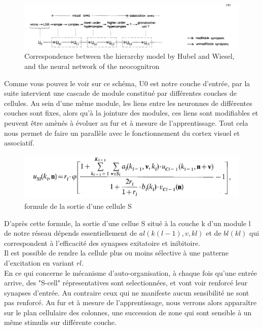 \documentclass[12pt, letterpaper]{article}
\begin{document}
\begin{figure}[H]
    \includegraphics[width=\linewidth]{img/fig1.png}
    \caption{Correspondence between the hierarchy model by Hubel and Wiesel, and the neural network of the neocognitron}
    \label{fig:L1}
\end{figure}

Comme vous pouvez le voir sur ce schéma, U0 est notre couche d'entrée, par la suite intervient une cascade de module constitué par différentes couches de cellules.
Au sein d'une même module, les liens entre les neuronnes de différentes couches sont fixes, alors qu'à la jointure des 
modules, ces liens sont modifiables et peuvent être amènés à évoluer au fur et à mesure de l'apprentissage.
Tout cela nous permet de faire un parallèle avec le fonctionnement du cortex visuel et associatif.
\begin{figure}[H]
    \includegraphics[width=\linewidth]{img/fig2.png}
    \caption{formule de la sortie d'une cellule S}
    \label{fig:L2}
\end{figure}
D'après cette formule, la sortie d'une cellue S situé à la couche k d'un module l de notre réseau dépends essentiellement 
de $al(k(l-1), v, kl)$ et de $bl(kl)$ qui correspondent à l'efficacité des synapses exitatoire et inibitoire.\\
Il est possible de rendre la cellule plus ou moins sélective à une patterne d'excitation en variant $rl$. \\
En ce qui concerne le mécanisme d'auto-organisation, à chaque fois qu'une entrée arrive, des "S-cell" répresentatives sont selectionnées, et vont 
voir renforcé leur synapses d'entrée. Au contraire ceux qui ne manifeste aucun sensibilité ne sont pas renforcé. Au fur et à mesure de l'apprentissage, 
nous verrons alors apparaître sur le plan cellulaire des colonnes, une succession de zone qui sont sensible à un même stimulis sur différente couche.
\end{document}
